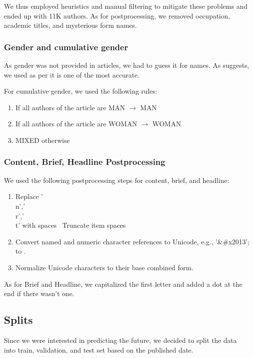 We thus employed heuristics and manual filtering 
to mitigate these problems and ended up with 11K authors.
As for postprocessing, we removed occupation, academic titles, and mysterious form names.

\subsubsection{Gender and cumulative gender}
\label{sec:gender}
As gender was not provided in articles, we had to guess it for names.
As \cite{seboPerformanceGenderDetection} suggests,
we used \cite{NamsorNameChecker} as per \cite{seboPerformanceGenderDetection}
it is one of the most accurate. 

For cumulative gender, we used the following rules:
\begin{enumerate}
    \item If all authors of the article are MAN $\rightarrow$ MAN
    \item If all authors of the article are WOMAN $\rightarrow$ WOMAN
    \item MIXED otherwise
\end{enumerate}

\subsubsection{Content, Brief, Headline Postprocessing}
We used the following postprocessing steps for content, brief, and headline:
\begin{enumerate}
    \item Replace '\\n','\\r','\\t' with spaces
    \ Truncate item spaces
    \item Convert named and numeric character references to Unicode,
    e.g., '\&\#x2013'; to \textendash.
    \item Normalize Unicode characters to their base combined form.
\end{enumerate}
As for Brief and Headline, we capitalized the first letter
and added a dot at the end if there wasn't one.

\subsection{Splits}
Since we were interested in predicting the future,
we decided to split the data into train, validation, and test set based on the published date.

